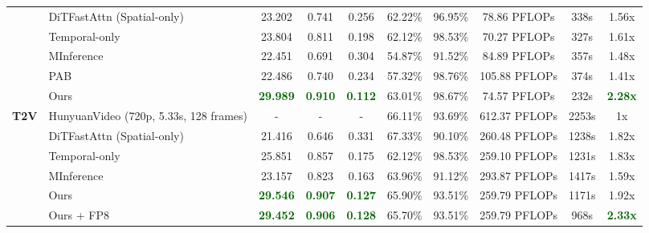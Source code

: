 \begin{table*}[!t]
{\begin{tabular}{c|l|ccccc|ccc}
\midrule
& DiTFastAttn (Spatial-only) & 23.202 & 0.741 & 0.256 & 62.22\% & 96.95\% & 78.86 PFLOPs &  338s & 1.56x \\
& Temporal-only & 23.804 & 0.811 & 0.198 & 62.12\% & 98.53\% & 70.27 PFLOPs &  327s & 1.61x \\
& MInference & 22.451 & 0.691 & 0.304 & 54.87\% & 91.52\% & 84.89 PFLOPs & 357s  & 1.48x \\
& PAB & 22.486 & 0.740 & 0.234 & 57.32\% & 98.76\% & 105.88 PFLOPs & 374s  & 1.41x \\
\rowcolor{lightblue}
& Ours & \textbf{\textcolor{darkgreen}{29.989}} & \textbf{\textcolor{darkgreen}{0.910}} & \textbf{\textcolor{darkgreen}{0.112}} & 63.01\% & 98.67\% & 74.57 PFLOPs &   232s & \textbf{\textcolor{darkgreen}{2.28x}} \\
\midrule
\textbf{T2V} & HunyuanVideo (720p, 5.33s, 128 frames) & - & - & - & 66.11\% & 93.69\% & 612.37 PFLOPs &  2253s & 1x \\
\midrule
& DiTFastAttn (Spatial-only) & 21.416 & 0.646 & 0.331 & 67.33\% & 90.10\% & 260.48 PFLOPs &   1238s & 1.82x \\
& Temporal-only & 25.851 & 0.857 & 0.175 & 62.12\% & 98.53\% & 259.10 PFLOPs &  1231s & 1.83x \\
& MInference & 23.157 & 0.823 & 0.163 & 63.96\% & 91.12\% & 293.87 PFLOPs &  1417s  &  1.59x \\
\rowcolor{lightblue}
& Ours & \textbf{\textcolor{darkgreen}{29.546}} & \textbf{\textcolor{darkgreen}{0.907}} & \textbf{\textcolor{darkgreen}{0.127}} & 65.90\% & 93.51\% & 259.79 PFLOPs &   1171s & 1.92x \\
\rowcolor{lightblue}
& Ours + FP8 & \textbf{\textcolor{darkgreen}{29.452}} & \textbf{\textcolor{darkgreen}{0.906}} & \textbf{\textcolor{darkgreen}{0.128}} & 65.70\% & 93.51\% & 259.79 PFLOPs &  968s & \textbf{\textcolor{darkgreen}{2.33x}} \\
\bottomrule
\end{tabular}%
}
\end{table*}
